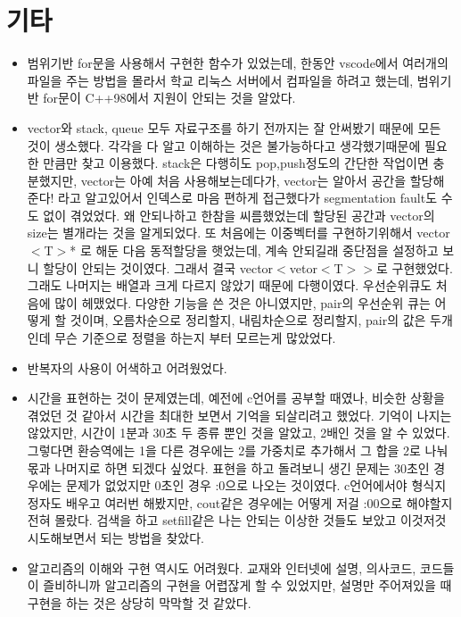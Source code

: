 \documentclass[a4paper,11pt]{article}
\begin{document}
\section{기타}
\begin{itemize}
\item 범위기반 for문을 사용해서 구현한 함수가 있었는데, 한동안 vscode에서 여러개의 파일을 주는 방법을 몰라서 학교 리눅스 서버에서 컴파일을 하려고 했는데, 범위기반 for문이 C++98에서 지원이 안되는 것을 알았다.
\item vector와 stack, queue 모두 자료구조를 하기 전까지는 잘 안써봤기 때문에 모든 것이 생소했다. 각각을 다 알고 이해하는 것은 불가능하다고 생각했기때문에 필요한 만큼만 찾고 이용했다. stack은 다행히도 pop,push정도의 간단한 작업이면 충분했지만, vector는 아예 처음 사용해보는데다가, vector는 알아서 공간을 할당해준다! 라고 알고있어서 인덱스로 마음 편하게 접근했다가 segmentation fault도 수도 없이 겪었었다. 왜 안되나하고 한참을 씨름했었는데 할당된 공간과 vector의 size는 별개라는 것을 알게되었다. 또 처음에는 이중벡터를 구현하기위해서 vector$<$T$>$* 로 해둔 다음 동적할당을 햇었는데, 계속 안되길래 중단점을 설정하고 보니 할당이 안되는 것이였다. 그래서 결국 vector$<$vetor$<$T$>$$>$로 구현했었다. 그래도 나머지는 배열과 크게 다르지 않았기 때문에 다행이였다. 우선순위큐도 처음에 많이 헤맸었다. 다양한 기능을 쓴 것은 아니였지만, pair의 우선순위 큐는 어떻게 할 것이며, 오름차순으로 정리할지, 내림차순으로 정리할지, pair의 값은 두개인데 무슨 기준으로 정렬을 하는지 부터 모르는게 많았었다. 
\item 반복자의 사용이 어색하고 어려웠었다. 
\item 시간을 표현하는 것이 문제였는데, 예전에 c언어를 공부할 때였나, 비슷한 상황을 겪었던 것 같아서 시간을 최대한 보면서 기억을 되살리려고 했었다. 기억이 나지는 않았지만, 시간이 1분과 30초 두 종류 뿐인 것을 알았고, 2배인 것을 알 수 있었다. 그렇다면 환승역에는 1을 다른 경우에는 2를 가중치로 추가해서 그 합을 2로 나눠 몫과 나머지로 하면 되겠다 싶었다. 표현을 하고 돌려보니 생긴 문제는 30초인 경우에는 문제가 없었지만 0초인 경우 :0으로 나오는 것이였다. c언어에서야 형식지정자도 배우고 여러번 해봤지만, cout같은 경우에는 어떻게 저걸 :00으로 해야할지 전혀 몰랐다. 검색을 하고 setfill같은 나는 안되는 이상한 것들도 보았고 이것저것 시도해보면서 되는 방법을 찾았다. 
\item 알고리즘의 이해와 구현 역시도 어려웠다. 교재와 인터넷에 설명, 의사코드, 코드들이 즐비하니까 알고리즘의 구현을 어렵잖게 할 수 있었지만, 설명만 주어져있을 때 구현을 하는 것은 상당히 막막할 것 같았다. 
\end{itemize}
\end{document}
